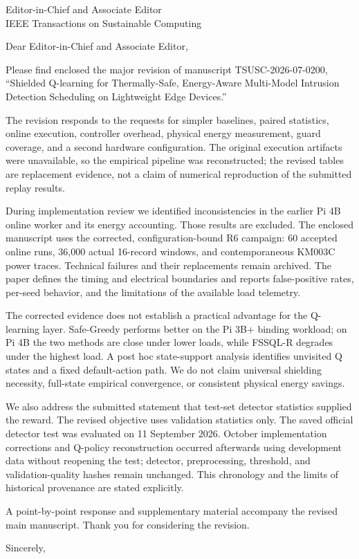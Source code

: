 \documentclass[10pt]{letter}
\date{22 October 2026}
\begin{document}
\begin{letter}{Editor-in-Chief and Associate Editor\\IEEE Transactions on Sustainable Computing}
\opening{Dear Editor-in-Chief and Associate Editor,}
Please find enclosed the major revision of manuscript TSUSC-2026-07-0200, ``Shielded Q-learning for Thermally-Safe, Energy-Aware Multi-Model Intrusion Detection Scheduling on Lightweight Edge Devices.''

The revision responds to the requests for simpler baselines, paired statistics, online execution, controller overhead, physical energy measurement, guard coverage, and a second hardware configuration. The original execution artifacts were unavailable, so the empirical pipeline was reconstructed; the revised tables are replacement evidence, not a claim of numerical reproduction of the submitted replay results.

During implementation review we identified inconsistencies in the earlier Pi 4B online worker and its energy accounting. Those results are excluded. The enclosed manuscript uses the corrected, configuration-bound R6 campaign: 60 accepted online runs, 36,000 actual 16-record windows, and contemporaneous KM003C power traces. Technical failures and their replacements remain archived. The paper defines the timing and electrical boundaries and reports false-positive rates, per-seed behavior, and the limitations of the available load telemetry.

The corrected evidence does not establish a practical advantage for the Q-learning layer. Safe-Greedy performs better on the Pi 3B+ binding workload; on Pi 4B the two methods are close under lower loads, while FSSQL-R degrades under the highest load. A post hoc state-support analysis identifies unvisited Q states and a fixed default-action path. We do not claim universal shielding necessity, full-state empirical convergence, or consistent physical energy savings.

We also address the submitted statement that test-set detector statistics supplied the reward. The revised objective uses validation statistics only. The saved official detector test was evaluated on 11 September 2026. October implementation corrections and Q-policy reconstruction occurred afterwards using development data without reopening the test; detector, preprocessing, threshold, and validation-quality hashes remain unchanged. This chronology and the limits of historical provenance are stated explicitly.

A point-by-point response and supplementary material accompany the revised main manuscript. Thank you for considering the revision.
\closing{Sincerely,}
\end{letter}
\end{document}
